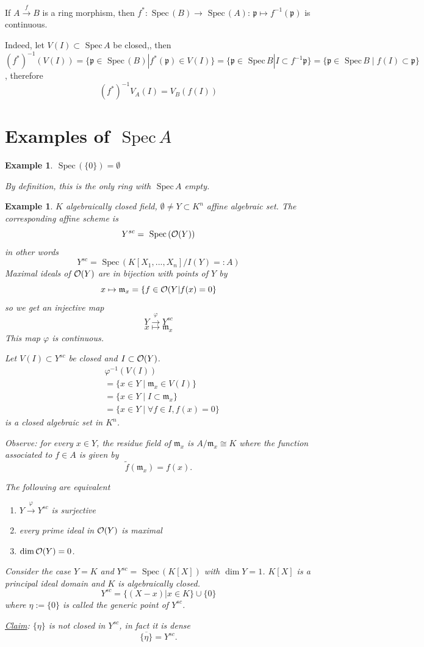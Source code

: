 \documentclass[11pt]{article}
\newtheorem{ex}[thm]{Example}
\newcommand{\spec}{\text{ Spec}\,}
\newcommand{\scm}{{\mathfrak m}}
\newcommand{\scp}{{\mathfrak p}}
\newcommand{\calo}{{\cal O}}
\newcommand{\lrta}{\longrightarrow}
\begin{document}
If $A\overset{f}{\lrta} B$ is a ring morphism, then $f^*:\spec(B)\lrta \spec (A)$: $\scp\mapsto f^{-1}(\scp)$ is continuous.

Indeed, let $V(I)\subset \spec A$ be closed,, then $(f^{*})^{-1}(V(I))=\{\scp\in\spec (B)|f^*(\scp)\in V(I)\}=\{\scp\in\spec B|I\subset f^{-1}\scp\}=\{\scp \in \spec B\mid f(I)\subset \scp\}$, therefore
$$
(f^{*})^{-1}V_A(I)=V_B(f(I))
$$

\section*{Examples of $\spec A$}
\begin{ex}
$\spec (\{0\})=\emptyset$

By definition, this is the only ring with $\spec A$ empty.
\end{ex}

\begin{ex}\label{ex:K-algebra}
$K$ algebraically closed field, $\emptyset\neq Y\subset K^n$ affine algebraic set. The corresponding  affine scheme is 
$$
Y^{sc}
=\spec (\calo(Y))$$
in other words
$$
Y^{sc}=\spec (K[X_1,...,X_n]/I(Y)=:A)
$$
Maximal ideals of $\calo(Y)$ are in bijection with points of $Y$ by 
$$
x\mapsto \scm_x=\{f\in\calo(Y|f(x)=0\}
$$
so we get an injective map
$$
Y\overset{\varphi}{\lrta} Y^{sc}
$$
$$
x\longmapsto \scm_x
$$
This map $\varphi$ is continuous.

Let $V(I)\subset Y^{sc}$ be closed and $I\subset \calo(Y)$.
$$
\begin{aligned}
&\varphi^{-1}(V(I))\\
&=\{x\in Y\mid \scm_x\in V(I)\}\\
&=\{x\in Y\mid I\subset\scm_x\}\\
&=\{x\in Y\mid \forall f\in I, f(x)=0\}
\end{aligned}
$$
is a closed algebraic set in $K^n$.

Observe: for every $x\in Y$, the residue field of $\scm_x$ is $A/\scm_x \cong K$ where the function associated to $f\in A$ is given by 
$$
\tilde{f}(\scm_x)=f(x).
$$

The following are equivalent
\begin{enumerate}
\item $Y\overset{\varphi}{\lrta} Y^{sc}$ is surjective
\item every prime ideal in $\calo(Y)$ is maximal
\item $\dim \calo(Y) = 0$.
\end{enumerate}
Consider the case $Y=K$ and $Y^{sc}=\spec (K[X])$ with $\dim Y=1$.
$K[X]$ is a principal ideal domain and $K$ is algebraically closed.
$$
Y^{sc}=\{(X-x)|x\in K\}\cup \{0\}
$$
where $\eta:=\{0\}$ is called the generic point of $Y^{sc}$.

\underline{Claim}: $\{\eta\}$ is not closed in $Y^{sc}$, in fact it is dense
$$
\overline{\{\eta\}}=Y^{sc}.
$$
\end{ex}
\end{document}
